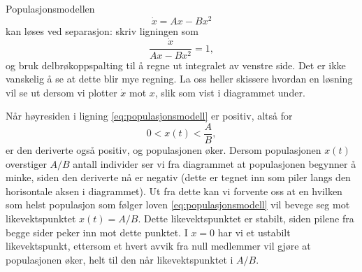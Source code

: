 \documentclass{article}
\theoremstyle{plain}
\theoremstyle{definition}
\theoremstyle{remark}
\newenvironment{ex}
{\pushQED{\qed}\renewcommand{\qedsymbol}{$\triangle$}\exx}
{\popQED\endexx}
\newcommand{\fcn}{x}
\begin{document}
\begin{ex} \label{eks:populasjon_2}
    Populasjonsmodellen
    \begin{equation} \label{eq:populasjonsmodell}
        \dot{\fcn} = A \fcn - B \fcn^2
    \end{equation}
    kan løses ved separasjon: skriv ligningen som
    \begin{equation*}
        \frac{\dot{\fcn}}{A \fcn - B \fcn^2} = 1,
    \end{equation*}
    og bruk delbrøkoppspalting til å regne ut integralet av venstre side. Det er ikke vanskelig å se at dette blir mye regning. La oss heller skissere hvordan en løsning vil se ut dersom vi plotter $\dot{\fcn}$ mot $\fcn$, slik som vist i diagrammet under.
    \begin{center}
    \end{center}
    Når høyresiden i ligning \eqref{eq:populasjonsmodell} er positiv, altså for
    \begin{equation*}
        0 < \fcn(t) < \frac{A}{B},
    \end{equation*}
    er den deriverte også positiv, og populasjonen øker. Dersom populasjonen $\fcn(t)$ overstiger $A/B$ antall individer ser vi fra diagrammet at populasjonen begynner å minke, siden den deriverte nå er negativ (dette er tegnet inn som piler langs den horisontale aksen i diagrammet). Ut fra dette kan vi forvente oss at en hvilken som helst populasjon som følger loven \eqref{eq:populasjonsmodell} vil bevege seg mot likevektspunktet $\fcn(t) = A/B$. Dette likevektspunktet er stabilt, siden pilene fra begge sider peker inn mot dette punktet. I $\fcn = 0$ har vi et ustabilt likevektspunkt, ettersom et hvert avvik fra null medlemmer vil gjøre at populasjonen øker, helt til den når likevektspunktet i $A/B$.
\end{ex}
\end{document}
